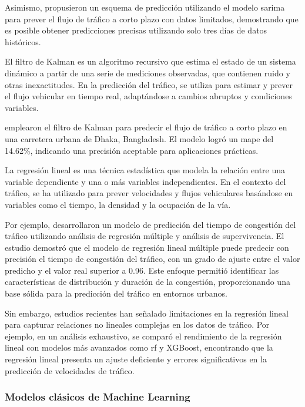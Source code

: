Asimismo, \cite{forecastSarima} propusieron un esquema de predicción utilizando el modelo \acrlong{sarima} para prever el flujo de tráfico a corto plazo con datos limitados, demostrando que es posible obtener predicciones precisas utilizando solo tres días de datos históricos.

El filtro de Kalman es un algoritmo recursivo que estima el estado de un sistema dinámico a partir de una serie de mediciones observadas, que contienen ruido y otras inexactitudes. En la predicción del tráfico, se utiliza para estimar y prever el flujo vehicular en tiempo real, adaptándose a cambios abruptos y condiciones variables.​

\cite{forecastKalman} emplearon el filtro de Kalman para predecir el flujo de tráfico a corto plazo en una carretera urbana de Dhaka, Bangladesh. El modelo logró un \acrlong{mape} del 14.62\%, indicando una precisión aceptable para aplicaciones prácticas.

La regresión lineal es una técnica estadística que modela la relación entre una variable dependiente y una o más variables independientes. En el contexto del tráfico, se ha utilizado para prever velocidades y flujos vehiculares basándose en variables como el tiempo, la densidad y la ocupación de la vía.​

Por ejemplo, \cite{liu2020congestion} desarrollaron un modelo de predicción del tiempo de congestión del tráfico utilizando análisis de regresión múltiple y análisis de supervivencia. El estudio demostró que el modelo de regresión lineal múltiple puede predecir con precisión el tiempo de congestión del tráfico, con un grado de ajuste entre el valor predicho y el valor real superior a 0.96. Este enfoque permitió identificar las características de distribución y duración de la congestión, proporcionando una base sólida para la predicción del tráfico en entornos urbanos.​

Sin embargo, estudios recientes han señalado limitaciones en la regresión lineal para capturar relaciones no lineales complejas en los datos de tráfico. Por ejemplo, en un análisis exhaustivo, se comparó el rendimiento de la regresión lineal con modelos más avanzados como \acrlong{rf} y XGBoost, encontrando que la regresión lineal presenta un ajuste deficiente y errores significativos en la predicción de velocidades de tráfico.

\subsubsection{Modelos clásicos de Machine Learning}

